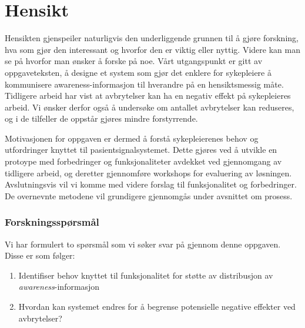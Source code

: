 \section{Hensikt}
\label{chp: hensikt}

Hensikten gjenspeiler naturligvis den underliggende grunnen til å gjøre forskning, hva som gjør den interessant og hvorfor den er viktig eller nyttig. Videre kan man se på hvorfor man ønsker å forske på noe. Vårt utgangspunkt er gitt av oppgaveteksten, å designe et system som gjør det enklere for sykepleiere å kommunisere awareness-informasjon til hverandre på en hensiktsmessig måte. Tidligere arbeid har vist at avbrytelser kan ha en negativ effekt på sykepleieres arbeid. Vi ønsker derfor også å undersøke om antallet avbrytelser kan reduseres, og i de tilfeller de oppstår gjøres mindre forstyrrende. 

\noindent
Motivasjonen for oppgaven er dermed å forstå sykepleierenes behov og utfordringer knyttet til pasientsignalsystemet. Dette gjøres ved å utvikle en protoype med forbedringer og funksjonaliteter avdekket ved gjennomgang av tidligere arbeid, og deretter gjennomføre workshops for evaluering av løsningen. Avslutningsvis vil vi komme med videre forslag til funksjonalitet og forbedringer. De overnevnte metodene vil grundigere gjennomgås under avsnittet om prosess. 

\subsubsection{Forskningsspørsmål}
Vi har formulert to spørsmål som vi søker svar på gjennom denne oppgaven. Disse er som følger:

\begin{enumerate}
\item Identifiser behov knyttet til funksjonalitet for støtte av distribusjon av \emph{awareness}-informasjon
\item Hvordan kan systemet endres for å begrense potensielle negative effekter ved avbrytelser?
\end{enumerate}
